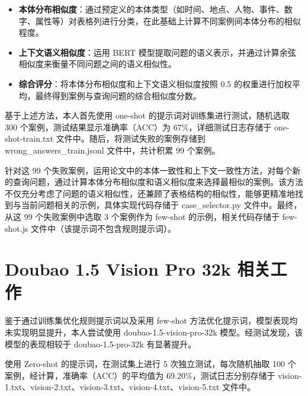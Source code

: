 \begin{itemize}
  \item \textbf{本体分布相似度}：通过预定义的本体类型（如时间、地点、人物、事件、数字、属性等）对表格列进行分类，在此基础上计算不同案例间本体分布的相似程度。
  \item \textbf{上下文语义相似度}：运用 BERT 模型提取问题的语义表示，并通过计算余弦相似度来衡量不同问题之间的语义相似性。
  \item \textbf{综合评分}：将本体分布相似度和上下文语义相似度按照 0.5 的权重进行加权平均，最终得到案例与查询问题的综合相似度分数。
\end{itemize}

基于上述方法，本人首先使用 one-shot 的提示词对训练集进行测试，随机选取 300 个案例，测试结果显示准确率（ACC）为 67\%，详细测试日志存储于 one-shot-train.txt 文件中。随后，将测试失败的案例存储到 wrong\_answers\_train.jsonl 文件中，共计积累 99 个案例。

针对这 99 个失败案例，运用论文中的本体一致性和上下文一致性方法，对每个新的查询问题，通过计算本体分布相似度和语义相似度来选择最相似的案例。该方法不仅充分考虑了问题的语义相似性，还兼顾了表格结构的相似性，能够更精准地找到与当前问题相关的示例，具体实现代码存储于 case\_selector.py 文件中。最终，从这 99 个失败案例中选取 3 个案例作为 few-shot 的示例，相关代码存储于 few-shot.js 文件中（该提示词不包含规则提示词）。

\section{Doubao 1.5 Vision Pro 32k 相关工作}
鉴于通过训练集优化规则提示词以及采用 few-shot 方法优化提示词，模型表现均未实现明显提升，本人尝试使用 doubao-1.5-vision-pro-32k 模型。经测试发现，该模型的表现相较于 doubao-1.5-pro-32k 有显著提升。



使用 Zero-shot 的提示词，在测试集上进行 5 次独立测试，每次随机抽取 100 个案例，经计算，准确率（ACC）的平均值为 69.20\%，测试日志分别存储于 vision-1.txt、vision-2.txt、vision-3.txt、vision-4.txt、vision-5.txt 文件中。

